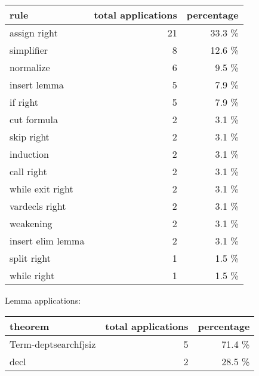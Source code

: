 \documentclass[a4paper]{article}
\begin{document}
\begin{supertabular}{l|r|r}
rule	        & total applications & percentage \\ \hline
assign right & 21 & 33.3 \% \\
simplifier & 8 & 12.6 \% \\
normalize & 6 & 9.5 \% \\
insert lemma & 5 & 7.9 \% \\
if right & 5 & 7.9 \% \\
cut formula & 2 & 3.1 \% \\
skip right & 2 & 3.1 \% \\
induction & 2 & 3.1 \% \\
call right & 2 & 3.1 \% \\
while exit right & 2 & 3.1 \% \\
vardecls right & 2 & 3.1 \% \\
weakening & 2 & 3.1 \% \\
insert elim lemma & 2 & 3.1 \% \\
split right & 1 & 1.5 \% \\
while right & 1 & 1.5 \% \\

\end{supertabular}

Lemma applications:

\begin{supertabular}{l|r|r}
theorem	        & total applications & percentage \\ \hline
Term-deptsearchfjsiz & 5 & 71.4 \% \\
decl & 2 & 28.5 \% \\

\end{supertabular}
\end{document}
